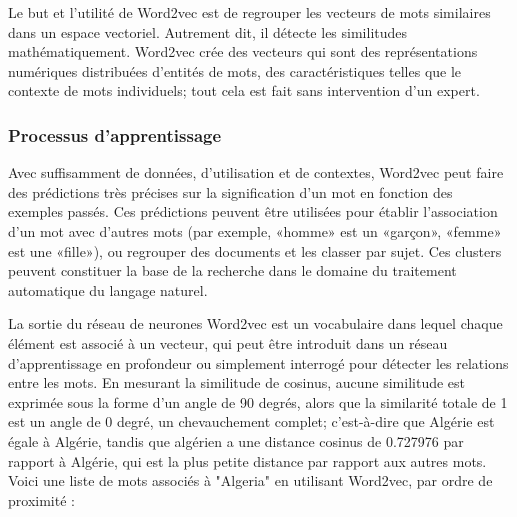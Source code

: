     Le but et l'utilité de Word2vec est de regrouper les vecteurs de mots similaires dans un espace vectoriel. Autrement dit, il détecte les similitudes mathématiquement. Word2vec crée des vecteurs qui sont des représentations numériques distribuées d'entités de mots, des caractéristiques telles que le contexte de mots individuels; tout cela est fait sans intervention d'un expert.
    
    \subsubsection{Processus d'apprentissage}
    
    Avec suffisamment de données, d'utilisation et de contextes, Word2vec peut faire des prédictions très précises sur la signification d'un mot en fonction des exemples passés. Ces prédictions peuvent être utilisées pour établir l'association d'un mot avec d'autres mots (par exemple, «homme» est un «garçon», «femme» est une «fille»), ou regrouper des documents et les classer par sujet. Ces clusters peuvent constituer la base de la recherche dans le domaine du traitement automatique du langage naturel.

    La sortie du réseau de neurones Word2vec est un vocabulaire dans lequel chaque élément est associé à un vecteur, qui peut être introduit dans un réseau d'apprentissage en profondeur ou simplement interrogé pour détecter les relations entre les mots. En mesurant la similitude de cosinus, aucune similitude est exprimée sous la forme d'un angle de 90 degrés, alors que la similarité totale de 1 est un angle de 0 degré, un chevauchement complet; c'est-à-dire que Algérie est égale à Algérie, tandis que algérien a une distance cosinus de 0.727976 par rapport à Algérie, qui est la plus petite distance par rapport aux autres mots. Voici une liste de mots associés à "Algeria" en utilisant Word2vec, par ordre de proximité :
    
